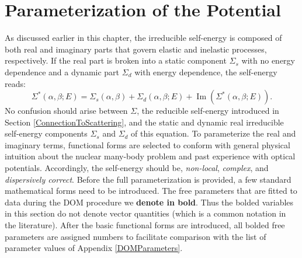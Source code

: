 \section{Parameterization of the Potential} \label{PotentialParameterization}
As discussed earlier in this chapter, the irreducible \gls{self-energy} is composed of both real and
imaginary parts that govern elastic and inelastic processes, respectively. If the real part is
broken into a static component $\Sigma_{s}$ with no energy dependence and a dynamic part
$\Sigma_{d}$ with energy dependence, the self-energy reads:
\begin{equation} \label{SelfEnergyBreakdown}
    \Sigma^{*}(\alpha,\beta;E) =  \Sigma_{s}(\alpha,\beta) + 
    \Sigma_{d}(\alpha,\beta;E) +
    \operatorname{Im}(\Sigma^{*}(\alpha,\beta;E)).
\end{equation}
No confusion should arise between $\Sigma$, the reducible self-energy introduced in Section
\ref{ConnectionToScattering}, and the static and dynamic real
irreducible self-energy components $\Sigma_{s}$ and $\Sigma_{d}$ of this equation.
To parameterize the real and imaginary terms, functional forms
are selected to conform with general physical intuition about the nuclear
many-body problem and past experience with \gls{optical potential}s. Accordingly,
the self-energy should be, \textit{non-local}, \textit{complex}, and
\textit{dispersively correct}.
Before the full parameterization is provided,
a few standard mathematical forms need to be introduced. The free parameters that
are fitted to data during the DOM procedure we \textbf{denote in bold}. Thus
the bolded variables in this section do not denote vector quantities (which is a common
notation in the literature).
After the basic functional forms are introduced, all bolded
free parameters are assigned numbers to facilitate comparison
with the list of parameter values of Appendix \ref{DOMParameters}.

